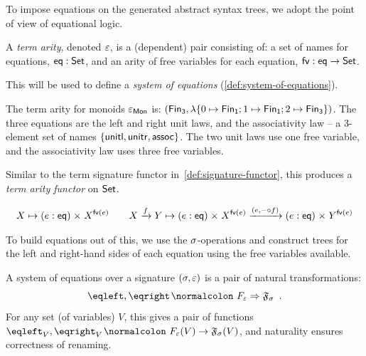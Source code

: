 %
To impose equations on the generated abstract syntax trees, we adopt the point of view of equational logic.
%
\begin{definition}
    \label{def:term-arity}
    A \emph{term arity}, denoted $\varepsilon$, is a (dependent) pair consisting of:
    a set of names for equations, $\operatorname{\mathsf{eq}} : \mathsf{Set}$, and
    an arity of free variables for each equation, $\operatorname{\mathsf{fv}} : \operatorname{\mathsf{eq}} \to \mathsf{Set}$.
\end{definition}
%
This will be used to define a \emph{system of equations} (\cref{def:system-of-equations}).
%
\begin{example}
    The term arity for monoids $\varepsilon_{\mathsf{Mon}}$ is:
    $(\Fin[3],\lambda \{0 \mapsto \Fin[1] ; 1 \mapsto \Fin[1] ; 2 \mapsto \Fin[3] \})$.
    The three equations are the left and right unit laws, and the associativity law --
    a 3-element set of names $\{ \operatorname{\mathsf{unitl}}, \operatorname{\mathsf{unitr}}, \operatorname{\mathsf{assoc}} \}$.
    The two unit laws use one free variable,
    and the associativity law uses three free variables.
\end{example}
%
Similar to the term signature functor in~\cref{def:signature-functor}, this produces a \emph{term arity functor} on $\mathsf{Set}$.
\begin{definition}
    \label{def:term-arity-functor}
    \begin{gather*}
        X \mapsto \dsum{e:\eqop}{X^{\eqfv(e)}}
        \qquad
        X \xto{f} Y \mapsto
        \dsum{e:\eqop}{X^{\eqfv(e)}}
        \xto{(e, \blank \comp f)}
        \dsum{e:\eqop}{Y^{\eqfv(e)}}
    \end{gather*}
\end{definition}
%
To build equations out of this,
we use the $\sigma$-operations and construct trees for the left and right-hand sides of each equation using the
free variables available.
%
\begin{definition}
    \label{def:system-of-equations}
    A system of equations over a signature $(\sigma,\varepsilon)$ is a pair of natural transformations:
    \[
        \eqleft, \eqright \colon \EqSig \natto \str{F}_{\sig} \enspace.
    \]
    For any set (of variables) $V$,
    this gives a pair of functions $\eqleft_{V}, \eqright_{V}\colon \EqSig(V) \to \str{F}_{\sig}(V)$,
    and naturality ensures correctness of renaming.
\end{definition}
